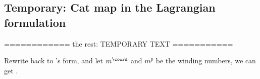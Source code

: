 \bigskip\bigskip



\subsection{Temporary: Cat map in the Lagrangian formulation}
\bigskip

============ the rest: TEMPORARY TEXT ===========

Rewrite  back to 's form,
and let $m^\coord$ and $m^p$ be the winding numbers, we can get
.

